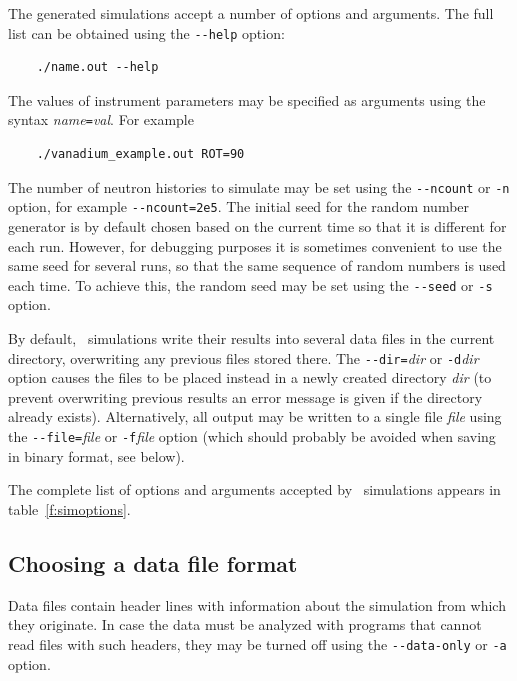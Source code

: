 The generated simulations accept a number of options and arguments. The
full list can be obtained using the \verb+--help+ option:
\begin{verbatim}
    ./name.out --help
\end{verbatim}
The values of instrument parameters may be specified as arguments using
the syntax \textit{name}\verb+=+\textit{val}. For example
\begin{verbatim}
    ./vanadium_example.out ROT=90
\end{verbatim}
The number of neutron histories to simulate may be set using the
\verb+--ncount+ or \verb+-n+ option, for example
\verb+--ncount=2e5+. The initial seed for the random number generator is
by default chosen based on the current time so that it is different for
each run. However, for debugging purposes it is sometimes convenient to
use the same seed for several runs, so that the same sequence of random
numbers is used each time. To achieve this, the random seed may be set
using the \verb+--seed+ or \verb+-s+ option.

By default, \MCS\ simulations write their results into several data files in the
current directory, overwriting any previous files stored there. The
\verb+--dir=+\textit{dir} or \verb+-d+\textit{dir} option causes the files to be
placed instead in a newly created directory \textit{dir} (to prevent overwriting
previous results an error message is given if the directory already exists).
Alternatively, all output may be written to a single file \textit{file} using
the \verb+--file=+\textit{file} or \verb+-f+\textit{file} option (which should probably be avoided when saving in binary format, see below).

The complete list of options
and arguments accepted by \MCS\ simulations appears in
table~\ref{f:simoptions}.

\subsection{Choosing a data file format}

Data files contain header lines with information about the
simulation from which they originate. In case the data must be analyzed
with programs that cannot read files with such headers, they may be
turned off using the \verb+--data-only+ or \verb+-a+ option.

